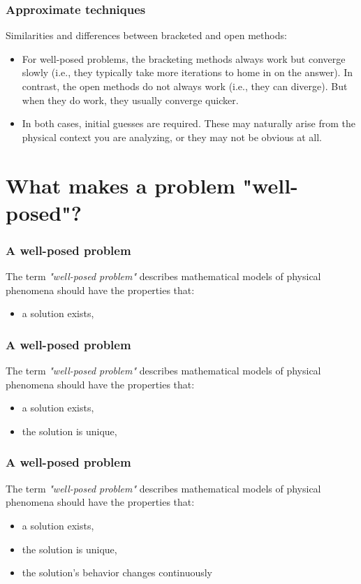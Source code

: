 \documentclass{if-beamer}
\begin{document}
\begin{frame}
\frametitle{Approximate techniques}
Similarities and differences between bracketed and open methods: \\
\vspace{10pt}
\begin{itemize}
	\item For well-posed problems, the bracketing methods always work but converge slowly (i.e., they typically take more iterations to home in on the answer). In contrast, the open methods do not always work (i.e., they can diverge). But when they do work, they usually converge quicker. \\\vspace{10pt}
	\item In both cases, initial guesses are required. These may naturally arise from the physical context you are analyzing, or they may not be obvious at all.
\end{itemize}
\end{frame}


\section{What makes a problem "well-posed"?}
\begin{frame}
\frametitle{A well-posed problem}
The term \textit{"well-posed problem"} describes mathematical models of physical phenomena should have the properties that:
\begin{itemize}
	\item a solution exists,
\end{itemize}

\end{frame}

\begin{frame}
\frametitle{A well-posed problem}
The term \textit{"well-posed problem"} describes mathematical models of physical phenomena should have the properties that:
\begin{itemize}
	\item a solution exists,
	\item the solution is unique,
\end{itemize}

\end{frame}

\begin{frame}
\frametitle{A well-posed problem}
The term \textit{"well-posed problem"} describes mathematical models of physical phenomena should have the properties that:
\begin{itemize}
	\item a solution exists,
	\item the solution is unique,
	\item the solution's behavior changes continuously
\end{itemize}
\end{frame}
\end{document}
